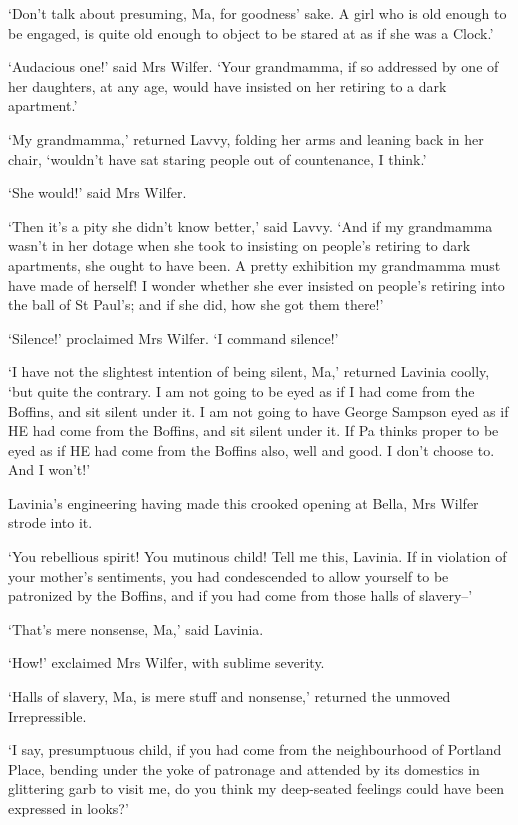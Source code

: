 ‘Don’t talk about presuming, Ma, for goodness’ sake. A girl who is old
enough to be engaged, is quite old enough to object to be stared at as
if she was a Clock.’

‘Audacious one!’ said Mrs Wilfer. ‘Your grandmamma, if so addressed by
one of her daughters, at any age, would have insisted on her retiring to
a dark apartment.’

‘My grandmamma,’ returned Lavvy, folding her arms and leaning back
in her chair, ‘wouldn’t have sat staring people out of countenance, I
think.’

‘She would!’ said Mrs Wilfer.

‘Then it’s a pity she didn’t know better,’ said Lavvy. ‘And if my
grandmamma wasn’t in her dotage when she took to insisting on people’s
retiring to dark apartments, she ought to have been. A pretty exhibition
my grandmamma must have made of herself! I wonder whether she ever
insisted on people’s retiring into the ball of St Paul’s; and if she
did, how she got them there!’

‘Silence!’ proclaimed Mrs Wilfer. ‘I command silence!’

‘I have not the slightest intention of being silent, Ma,’ returned
Lavinia coolly, ‘but quite the contrary. I am not going to be eyed as if
I had come from the Boffins, and sit silent under it. I am not going
to have George Sampson eyed as if HE had come from the Boffins, and sit
silent under it. If Pa thinks proper to be eyed as if HE had come from
the Boffins also, well and good. I don’t choose to. And I won’t!’

Lavinia’s engineering having made this crooked opening at Bella, Mrs
Wilfer strode into it.

‘You rebellious spirit! You mutinous child! Tell me this, Lavinia. If
in violation of your mother’s sentiments, you had condescended to allow
yourself to be patronized by the Boffins, and if you had come from those
halls of slavery--’

‘That’s mere nonsense, Ma,’ said Lavinia.

‘How!’ exclaimed Mrs Wilfer, with sublime severity.

‘Halls of slavery, Ma, is mere stuff and nonsense,’ returned the unmoved
Irrepressible.

‘I say, presumptuous child, if you had come from the neighbourhood of
Portland Place, bending under the yoke of patronage and attended by its
domestics in glittering garb to visit me, do you think my deep-seated
feelings could have been expressed in looks?’

